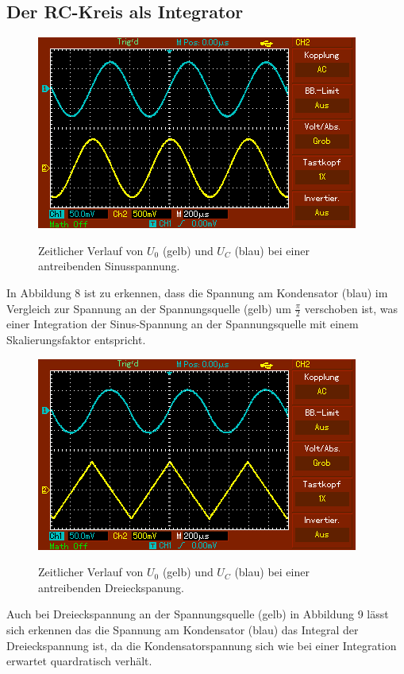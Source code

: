 	 \subsection{Der RC-Kreis als Integrator}
	 \begin{figure}[H]
	 	\centering
	 	\caption{Zeitlicher Verlauf von $U_0$ (gelb) und $U_C$ (blau) bei einer antreibenden Sinusspannung.}
	 	\includegraphics[width=\linewidth-70pt,height=\textheight-70pt,keepaspectratio]{content/MAP002.png}
	 	\label{fig:Sinus}
	 \end{figure}
	 In Abbildung 8 ist zu erkennen, dass die Spannung am Kondensator (blau) im Vergleich zur Spannung an der Spannungsquelle (gelb) um $\frac{\pi}{2}$ verschoben ist, was einer Integration der Sinus-Spannung an der Spannungsquelle mit einem Skalierungsfaktor entspricht.


	 \begin{figure}[H]
	 	\centering
	 	\caption{Zeitlicher Verlauf von $U_0$ (gelb) und $U_C$ (blau) bei einer antreibenden Dreieckspanung.}
	 	\includegraphics[width=\linewidth-70pt,height=\textheight-70pt,keepaspectratio]{content/MAP003.png}
	 	\label{fig:Dreieck}
	 \end{figure}
	 Auch bei Dreieckspannung an der Spannungsquelle (gelb) in Abbildung 9 lässt sich erkennen das die Spannung am Kondensator (blau) das Integral der Dreieckspannung ist, da die Kondensatorspannung sich wie bei einer Integration erwartet quardratisch verhält.

